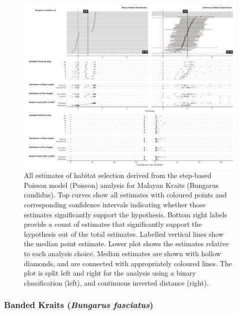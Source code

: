 \documentclass[10pt,a4paper]{article}
\begin{document}
\begin{figure}
\includegraphics[width=1\linewidth]{../../figures/specCurve_Bungarus candidus_pois} \caption{All estimates of habitat selection derived from the step-based Poisson model (Poisson) analysis for Malayan Kraits (Bungarus candidus). Top curves show all estimates with coloured points and corresponding confidence intervals indicating whether those estimates significantly support the hypothesis. Bottom right labels provide a count of estimates that significantly support the hypothesis out of the total estimates. Labelled vertical lines show the median point estimate. Lower plot shows the estimates relative to each analysis choice. Median estimates are shown with hollow diamonds, and are connected with appropriately coloured lines. The plot is split left and right for the analysis using a binary classification (left), and continuous inverted distance (right).}\label{fig:specCurvePoisBUCA}
\end{figure}

\subsubsection{\texorpdfstring{Banded Kraits (\emph{Bungarus fasciatus})}{Banded Kraits (Bungarus fasciatus)}}\label{banded-kraits-bungarus-fasciatus}
\end{document}

